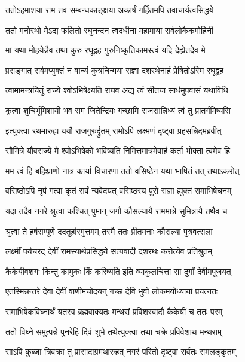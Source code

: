 \twolineshloka
{ततोऽहमाशया राम तव सम्बन्धकाङ्क्षया}
{अकार्षं गर्हितमपि तवाचार्यत्वसिद्धये} %

\twolineshloka
{ततो मनोरथो मेऽद्य फलितो रघुनन्दन}
{त्वदधीना महामाया सर्वलोकैकमोहिनी} %

\twolineshloka
{मां यथा मोहयेन्नैव तथा कुरु रघूद्वह}
{गुरुनिष्कृतिकामस्त्वं यदि देह्येतदेव मे} %

\twolineshloka
{प्रसङ्गात् सर्वमप्युक्तं न वाच्यं कुत्रचिन्मया}
{राज्ञा दशरथेनाहं प्रेषितोऽस्मि रघूद्वह} %

\twolineshloka
{त्वामामन्त्रयितुं राज्ये श्वोऽभिषेक्ष्यति राघव}
{अद्य त्वं सीतया सार्धमुपवासं यथाविधि} %

\twolineshloka
{कृत्वा शुचिर्भूमिशायी भव राम जितेन्द्रियः}
{गच्छामि राजसान्निध्यं त्वं तु प्रातर्गमिष्यसि} %

\twolineshloka
{इत्युक्त्वा रथमारुह्य ययौ राजगुरुर्द्रुतम्}
{रामोऽपि लक्ष्मणं दृष्ट्वा प्रहसन्निदमब्रवीत्} %

\twolineshloka
{सौमित्रे यौवराज्ये मे श्वोऽभिषेको भविष्यति}
{निमित्तमात्रमेवाहं कर्ता भोक्ता त्वमेव हि} %

\twolineshloka
{मम त्वं हि बहिःप्राणो नात्र कार्या विचारणा}
{ततो वसिष्ठेन यथा भाषितं तत् तथाऽकरोत्} %

\twolineshloka
{वसिष्ठोऽपि नृपं गत्वा कृतं सर्वं न्यवेदयत्}
{वसिष्ठस्य पुरो राज्ञा ह्युक्तं रामाभिषेचनम्} %

\twolineshloka
{यदा तदैव नगरे श्रुत्वा कश्चित् पुमान् जगौ}
{कौसल्यायै राममात्रे सुमित्रायै तथैव च} %

\twolineshloka
{श्रुत्वा ते हर्षसम्पूर्णे ददतुर्हारमुत्तमम्}
{तस्मै ततः प्रीतमनाः कौसल्या पुत्रवत्सला} %

\twolineshloka
{लक्ष्मीं पर्यचरद् देवीं रामस्यार्थप्रसिद्धये}
{सत्यवादी दशरथः करोत्येव प्रतिश्रुतम्} %

\twolineshloka
{कैकेयीवशगः किन्तु कामुकः किं करिष्यति}
{इति व्याकुलचित्ता सा दुर्गां देवीमपूजयत्} %

\twolineshloka
{एतस्मिन्नन्तरे देवा देवीं वाणीमचोदयन्}
{गच्छ देवि भुवो लोकमयोध्यायां प्रयत्नतः} %

\twolineshloka
{रामाभिषेकविघ्नार्थं यतस्व ब्रह्मवाक्यतः}
{मन्थरां प्रविशस्वादौ कैकेयीं च ततः परम्} %

\twolineshloka
{ततो विघ्ने समुत्पन्ने पुनरेहि दिवं शुभे}
{तथेत्युक्त्वा तथा चक्रे प्रविवेशाथ मन्थराम्} %

\twolineshloka
{साऽपि कुब्जा त्रिवक्रा तु प्रासादाग्रमथारुहत्}
{नगरं परितो दृष्ट्वा सर्वतः समलङ्कृतम्} %

